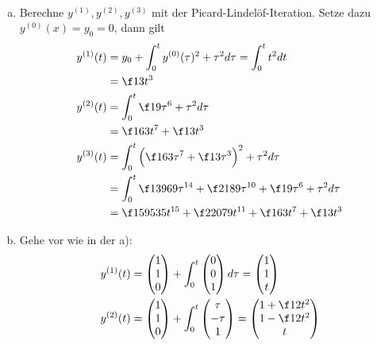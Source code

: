 \documentclass{mywork}
\begin{document}
\setcounter{section}{2}
\setcounter{aufgabe}{5}

\begin{aufgabe}~

	\begin{enumerate}[a)]
		\item
			Berechne $y^{(1)}, y^{(2)}, y^{(3)}$ mit der Picard-Lindelöf-Iteration.
			Setze dazu $y^{(0)}(x) = y_0 = 0$, dann gilt
			\begin{align*}
				y^{(1)}(t) &= y_0 + \int_0^t y^{(0)}(\tau)^2 + \tau^2 d\tau = \int_0^t t^2 dt  \\
				&= \f 13 t^3 \\
				y^{(2)}(t) &= \int_0^t \f 19 \tau^6 + \tau^2 d\tau \\
				&= \f 1{63} t^7 + \f 13 t^3 \\
				y^{(3)}(t) &= \int_0^t \Big( \f 1{63}\tau^7 + \f 13 \tau^3 \Big)^2 + \tau^2 d\tau \\
				&= \int_0^t \f 1{3969}\tau^{14} + \f 2{189} \tau^{10}  + \f 19 \tau^6 + \tau^2 d\tau \\ 
				&= \f 1{59535}t^{15} + \f 2{2079} t^{11} + \f 1{63} t^7 + \f 13 t^3
			\end{align*}
		\item
			Gehe vor wie in der a):
			\begin{align*}
				y^{(1)}(t) &= \begin{pmatrix}
					1 \\ 1 \\ 0
				\end{pmatrix} + \int_0^t \begin{pmatrix}
					0 \\ 0 \\ 1
				\end{pmatrix} d\tau
				= \begin{pmatrix}
					1 \\ 1 \\ t
				\end{pmatrix} \\
				y^{(2)}(t) &= \begin{pmatrix}
					1 \\ 1 \\ 0
				\end{pmatrix} + \int_0^t \begin{pmatrix}
					\tau \\ - \tau \\ 1
				\end{pmatrix} = \begin{pmatrix}
					1 + \f 12 t^2  \\ 1 - \f 12 t^2 \\ t

\end{pmatrix}
\end{align*}
\end{enumerate}
\end{aufgabe}
\end{document}
